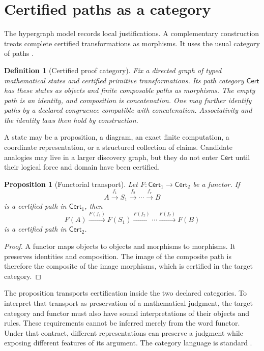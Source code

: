 \documentclass[11pt,oneside]{article}
\theoremstyle{komorebiplain}
\newtheorem{proposition}[theorem]{Proposition}
\theoremstyle{komorebidefinition}
\newtheorem{definition}[theorem]{Definition}
\theoremstyle{komorebiremark}
\begin{document}
\section{Certified paths as a category}
\label{sec:old6}

The hypergraph model records local justifications. A complementary construction treats complete certified transformations as morphisms. It uses the usual category of paths \cite{maclane}.

\begin{definition}[Certified proof category]
\label{res:6:1}
Fix a directed graph of typed mathematical states and certified primitive transformations. Its path category $\mathsf{Cert}$ has these states as objects and finite composable paths as morphisms. The empty path is an identity, and composition is concatenation. One may further identify paths by a declared congruence compatible with concatenation. Associativity and the identity laws then hold by construction.
\end{definition}

A state may be a proposition, a diagram, an exact finite computation, a coordinate representation, or a structured collection of claims. Candidate analogies may live in a larger discovery graph, but they do not enter $\mathsf{Cert}$ until their logical force and domain have been certified.

\begin{proposition}[Functorial transport]
\label{res:6:2}
Let $F:\mathsf{Cert}_1\to\mathsf{Cert}_2$ be a functor. If
\[
A\xrightarrow{f_1}S_1\xrightarrow{f_2}\cdots\xrightarrow{f_r}B
\]
is a certified path in $\mathsf{Cert}_1$, then
\[
F(A)\xrightarrow{F(f_1)}F(S_1)\xrightarrow{F(f_2)}\cdots\xrightarrow{F(f_r)}F(B)
\]
is a certified path in $\mathsf{Cert}_2$.
\end{proposition}

\begin{proof}
A functor maps objects to objects and morphisms to morphisms. It preserves identities and composition. The image of the composite path is therefore the composite of the image morphisms, which is certified in the target category.
\end{proof}

The proposition transports certification inside the two declared categories. To interpret that transport as preservation of a mathematical judgment, the target category and functor must also have sound interpretations of their objects and rules. These requirements cannot be inferred merely from the word functor. Under that contract, different representations can preserve a judgment while exposing different features of its argument. The category language is standard \cite{maclane}.
\end{document}

